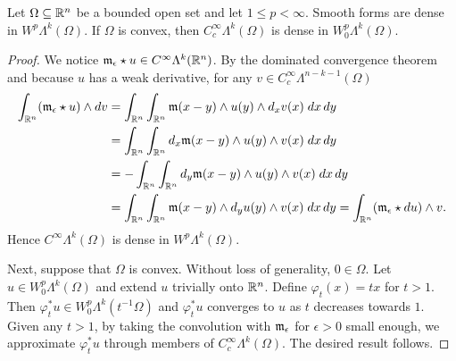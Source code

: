 \documentclass[10pt,letterpaper]{article}
\begin{document}
\begin{lemma}
    Let $\Omega \subseteq {\mathbb R}^{n}$ be a bounded open set and let $1 \leq p < \infty$. 
    Smooth forms are dense in $W^{p}\Lambda^{k}(\Omega)$.
    If $\Omega$ is convex, then $C^{\infty}_{c}\Lambda^{k}(\Omega)$ is dense in $W^{p}_{0}\Lambda^{k}(\Omega)$.
\end{lemma}
\begin{proof}
    We notice ${\mathfrak m}_{\epsilon} \star u \in C^{\infty}\Lambda^{k}({\mathbb R}^{n})$. 
    By the dominated convergence theorem and because $u$ has a weak derivative,
    for any $v \in C^{\infty}_{c}\Lambda^{n-k-1}(\Omega)$
    \begin{align*}
        \int_{{\mathbb R}^{n}} ( {\mathfrak m}_{\epsilon} \star u ) \wedge d v 
        &= 
        \int_{{\mathbb R}^{n}} \int_{{\mathbb R}^{n}} {\mathfrak m}(x-y) \wedge u(y) \wedge d_{x} v(x) \;dx\,dy
        \\&= 
        \int_{{\mathbb R}^{n}} \int_{{\mathbb R}^{n}} d_x{\mathfrak m}(x-y) \wedge u(y) \wedge v(x) \;dx\,dy
        \\&= 
        - \int_{{\mathbb R}^{n}} \int_{{\mathbb R}^{n}} d_y{\mathfrak m}(x-y) \wedge u(y) \wedge v(x) \;dx\,dy
        \\&= 
        \int_{{\mathbb R}^{n}} \int_{{\mathbb R}^{n}} {\mathfrak m}(x-y) \wedge d_y u(y) \wedge v(x) \;dx\,dy
        = 
        \int_{{\mathbb R}^{n}} ( {\mathfrak m}_{\epsilon} \star d u ) \wedge v 
        .
    \end{align*}
    Hence $C^{\infty}\Lambda^{k}(\Omega)$ is dense in $W^{p}\Lambda^{k}(\Omega)$.
    
    Next, suppose that $\Omega$ is convex. Without loss of generality, $0 \in \Omega$. 
    Let $u \in W^{p}_{0}\Lambda^{k}(\Omega)$ and extend $u$ trivially onto ${\mathbb R}^{n}$. 
    Define $\varphi_t(x) = tx$ for $t > 1$. 
    Then $\varphi_{t}^{\ast} u \in W^{p}_{0}\Lambda^{k}(t^{-1}\Omega)$ 
    and $\varphi_{t}^{\ast} u$ converges to $u$ as $t$ decreases towards $1$. 
    Given any $t > 1$, by taking the convolution with ${\mathfrak m}_{\epsilon}$ for $\epsilon > 0$ small enough,
    we approximate $\varphi_{t}^{\ast} u$ through members of $C^{\infty}_{c}\Lambda^{k}(\Omega)$.
    The desired result follows. 
\end{proof}
\end{document}
